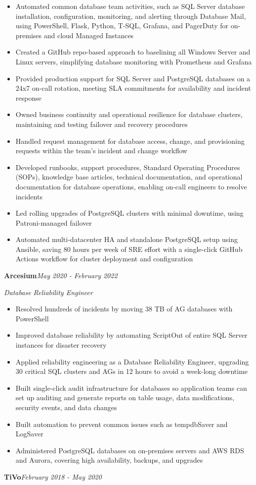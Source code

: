 \documentclass[10pt,a4paper]{article}
\begin{document}
\begin{itemize}
  \item Automated common database team activities, such as SQL Server database installation, configuration, monitoring, and alerting through Database Mail, using PowerShell, Flask, Python, T-SQL, Grafana, and PagerDuty for on-premises and cloud Managed Instances
  \item Created a GitHub repo-based approach to baselining all Windows Server and Linux servers, simplifying database monitoring with Prometheus and Grafana
  \item Provided production support for SQL Server and PostgreSQL databases on a 24x7 on-call rotation, meeting SLA commitments for availability and incident response
  \item Owned business continuity and operational resilience for database clusters, maintaining and testing failover and recovery procedures
  \item Handled request management for database access, change, and provisioning requests within the team's incident and change workflow
  \item Developed runbooks, support procedures, Standard Operating Procedures (SOPs), knowledge base articles, technical documentation, and operational documentation for database operations, enabling on-call engineers to resolve incidents
  \item Led rolling upgrades of PostgreSQL clusters with minimal downtime, using Patroni-managed failover
  \item Automated multi-datacenter HA and standalone PostgreSQL setup using Ansible, saving 80 hours per week of SRE effort with a single-click GitHub Actions workflow for cluster deployment and configuration
\end{itemize}
\vspace{14.7pt}
\noindent\textbf{Arcesium}\hfill \textit{May 2020 - February 2022}

\textit{Database Reliability Engineer}\\[-5pt]
\begin{itemize}
  \item Resolved hundreds of incidents by moving 38 TB of AG databases with PowerShell
  \item Improved database reliability by automating ScriptOut of entire SQL Server instances for disaster recovery
  \item Applied reliability engineering as a Database Reliability Engineer, upgrading 30 critical SQL clusters and AGs in 12 hours to avoid a week-long downtime
  \item Built single-click audit infrastructure for databases so application teams can set up auditing and generate reports on table usage, data modifications, security events, and data changes
  \item Built automation to prevent common issues such as tempdbSaver and LogSaver
  \item Administered PostgreSQL databases on on-premises servers and AWS RDS and Aurora, covering high availability, backups, and upgrades
\end{itemize}
\vspace{14.7pt}
\noindent\textbf{TiVo}\hfill \textit{February 2018 - May 2020}
\end{document}
